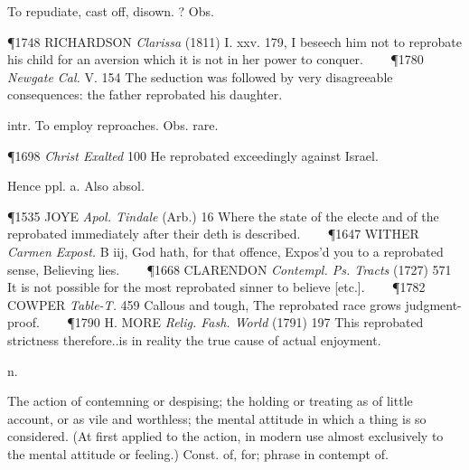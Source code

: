 \begin{description}[wide, labelwidth=!, labelindent=0pt]
\begin{myenumerate}
 To repudiate, cast off, disown. ? Obs.

\P 1748 RICHARDSON  \textit{Clarissa} (1811) I. xxv. 179, I beseech him not to reprobate his child for an aversion which it is not in her power to conquer.    
\P 1780 \textit{Newgate  Cal.} V. 154 The seduction was followed by very disagreeable consequences: the father reprobated his daughter.

 intr. To employ reproaches. Obs. rare.

\P 1698 \textit{Christ  Exalted} 100 He reprobated exceedingly against Israel.

\noindent Hence  ppl. a. Also absol.

\P 1535 JOYE  \textit{Apol. Tindale} (Arb.) 16 Where the state of the electe and of the reprobated immediately after their deth is described.    
\P 1647 WITHER  \textit{Carmen Expost.} B iij, God hath, for that offence, Expos'd you to a reprobated sense, Believing lies.    
\P 1668 CLARENDON  \textit{Contempl. Ps. Tracts} (1727) 571 It is not possible for the most reprobated sinner to believe [etc.].    
\P 1782 COWPER  \textit{Table-T.} 459 Callous and tough, The reprobated race grows judgment-proof.    
\P 1790 H. MORE  \textit{Relig. Fash. World} (1791) 197 This reprobated strictness therefore..is in reality the true cause of actual enjoyment.
\end{myenumerate}

 n.

\noindent {}

\vspace{-0.3cm}

\begin{myenumerate}

 The action of contemning or despising; the holding or treating as of little account, or as vile and worthless; the mental attitude in which a thing is so considered. (At first applied to the action, in modern use almost exclusively to the mental attitude or feeling.) Const. of, for; phrase in contempt of.


\end{myenumerate}
\end{description}
